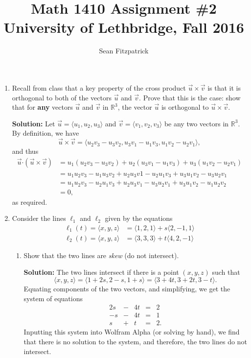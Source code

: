 \documentclass[letterpaper,12pt]{amsart}
\title{Math 1410 Assignment \#2\\University of Lethbridge, Fall 2016}
\author{Sean Fitzpatrick}
\newcommand{\R}{\mathbb{R}}
\newcommand{\dotp}{\boldsymbol{\cdot}}
\begin{document}
 \maketitle

\begin{enumerate}
\item Recall from class that a key property of the cross product $\vec{u}\times\vec{v}$ is that it is orthogonal to both of the vectors $\vec{u}$ and $\vec{v}$. Prove that this is the case: show that for \textbf{any} vectors $\vec{u}$ and $\vec{v}$ in $\R^3$, the vector $\vec{u}$ is orthogonal to $\vec{u}\times \vec{v}$.

\bigskip

{\bf Solution:} Let $\vec{u}=\langle u_1,u_2,u_3\rangle$ and $\vec{v} = \langle v_1, v_2, v_3\rangle$ be any two vectors in $\R^3$. By definition, we have
\[
 \vec{u}\times\vec{v} = \langle u_2v_3-u_3v_2, u_3v_1-u_1v_3, u_1v_2-u_2v_1\rangle,
\]
and thus
\begin{align*}
 \vec{u}\dotp(\vec{u}\times\vec{v}) &= u_1(u_2v_3-u_3v_2)+u_2(u_3v_1-u_1v_3)+u_3(u_1v_2-u_2v_1)\\
 & = u_1u_2v_3-u_1u_3v_2+u_2u_3v1-u_2u_1v_3+u_3u_1v_2-u_3u_2v_1\\
 & = u_1u_2v_3-u_2u_1v_3 + u_2u_3v_1 - u_3u_2v_1 +u_3u_1v_2-u_1u_2v_2\\
 & = 0,
\end{align*}
as required.

\bigskip

\item Consider the lines $\ell_1$ and $\ell_2$ given by the equations
\begin{align*}
 \ell_1(t) = \langle x,y,z\rangle & = \langle 1,2,1\rangle+s\langle 2,-1,1\rangle\\
 \ell_2(t) = \langle x,y,z\rangle & = \langle 3,3,3\rangle+t\langle 4,2,-1\rangle
\end{align*}

\medskip

\begin{enumerate}
 \item Show that the two lines are \textit{skew} (do not intersect). 

\bigskip

{\bf Solution:} The two lines intersect if there is a point $(x,y,z)$ such that
\[
 \langle x,y,z\rangle = \langle 1+2s,2-s,1+s\rangle = \langle 3+4t, 3+2t, 3-t\rangle.
\]
Equating components of the two vectors, and simplifying, we get the system of equations
\[
 \begin{array}{ccccc}
  2s&-&4t&=&2\\
  -s&-&4t&=&1\\
  s&+&t&=&2.
 \end{array}
\]
Inputting this system into Wolfram Alpha (or solving by hand), we find that there is no solution to the system, and therefore, the two lines do not intersect.


\end{enumerate}
\end{enumerate}
\end{document}
